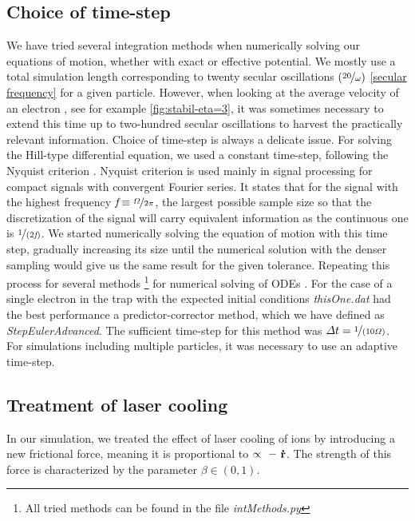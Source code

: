 \subsection{Choice of time-step}
We have tried several integration methods when numerically solving our equations of motion, whether with exact or effective potential. We mostly use a total simulation length corresponding to twenty secular oscillations $(\nicefrac{20}{\omega})$ \eqref{secular frequency} for a given particle. However, when looking at the average velocity of an electron , see for example \ref{fig:stabil-eta=3}, it was sometimes necessary to extend this time up to two-hundred secular oscillations to harvest the practically relevant information.
Choice of time-step is always a delicate issue. For solving the Hill-type differential equation, we used a constant time-step, following the Nyquist criterion \cite{1697831}. Nyquist criterion is used mainly in signal processing for compact signals with convergent Fourier series. It states that for the signal with the highest frequency $\textit{f} \equiv \nicefrac{\Omega}{2\pi}$, the largest possible sample size so that the discretization of the signal will carry equivalent information as the continuous one is $\nicefrac{1}{(2\textit{f})}$. We started numerically solving the equation of motion with this time step, gradually increasing its size until the numerical solution with the denser sampling would give us the same result for the given tolerance. Repeating this process for several methods \footnote{All tried methods can be found in the file \textit{intMethods.py}} for numerical solving of ODEs \cite{teukolsky1992numerical}. For the case of a single electron in the trap with the expected initial conditions \textit{thisOne.dat} had the best performance a predictor-corrector method, which we have defined as \textit{StepEulerAdvanced}. The sufficient time-step for this method was $\Delta t = \nicefrac{1}{(10 \Omega)}$. For simulations including multiple particles, it was necessary to use an adaptive time-step. 

\subsection{Treatment of laser cooling}
In our simulation, we treated the effect of laser cooling of ions by introducing a new frictional force, meaning it is proportional to $\propto \minus \vb{\dot{r}}$. The strength of this force is characterized by the parameter $\beta \in (0,1)$. 

